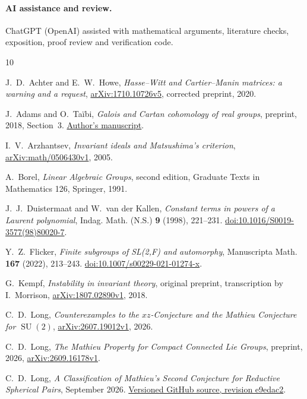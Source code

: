 \documentclass[11pt]{article}
\numberwithin{equation}{section}
\theoremstyle{definition}
\theoremstyle{remark}
\newcommand{\SU}{\operatorname{SU}}
\begin{document}
\paragraph{AI assistance and review.}
ChatGPT (OpenAI) assisted with mathematical arguments, literature checks,
exposition, proof review and verification code.

\begin{thebibliography}{10}

J.~D.~Achter and E.~W.~Howe,
\emph{Hasse--Witt and Cartier--Manin matrices: a warning and a request},
\href{https://arxiv.org/abs/1710.10726v5}{arXiv:1710.10726v5},
corrected preprint, 2020.

J.~Adams and O.~Ta\"ibi, \emph{Galois and Cartan cohomology of real groups},
preprint, 2018, Section~3.
\href{https://otaibi.perso.math.cnrs.fr/galois.pdf}{Author's manuscript}.

I.~V.~Arzhantsev, \emph{Invariant ideals and Matsushima's criterion},
\href{https://arxiv.org/abs/math/0506430v1}{arXiv:math/0506430v1}, 2005.

A.~Borel, \emph{Linear Algebraic Groups}, second edition,
Graduate Texts in Mathematics 126, Springer, 1991.

J.~J.~Duistermaat and W.~van der Kallen,
\emph{Constant terms in powers of a Laurent polynomial},
Indag. Math. (N.S.) \textbf{9} (1998), 221--231.
\href{https://doi.org/10.1016/S0019-3577(98)80020-7}{doi:10.1016/S0019-3577(98)80020-7}.

Y.~Z.~Flicker, \emph{Finite subgroups of SL(2,F) and automorphy},
Manuscripta Math. \textbf{167} (2022), 213--243.
\href{https://doi.org/10.1007/s00229-021-01274-x}{doi:10.1007/s00229-021-01274-x}.

G.~Kempf, \emph{Instability in invariant theory}, original preprint,
transcription by I.~Morrison,
\href{https://arxiv.org/abs/1807.02890v1}{arXiv:1807.02890v1}, 2018.

C.~D.~Long, \emph{Counterexamples to the $xz$-Conjecture and the
Mathieu Conjecture for $\SU(2)$},
\href{https://arxiv.org/abs/2607.19012v1}{arXiv:2607.19012v1}, 2026.

C.~D.~Long, \emph{The Mathieu Property for Compact Connected Lie Groups},
preprint, 2026,
\href{https://arxiv.org/abs/2609.16178v1}{arXiv:2609.16178v1}.

C.~D.~Long, \emph{A Classification of Mathieu's Second Conjecture for
Reductive Spherical Pairs}, September 2026.
\href{https://github.com/long-mathematics/mathieu-second-conjecture-spherical-pairs/blob/e9edac262b4b64eb68feb0e6e80496cefe4a1dee/mathieu_second_conjecture_spherical_pairs.tex}{Versioned GitHub source, revision e9edac2}.


\end{thebibliography}
\end{document}
